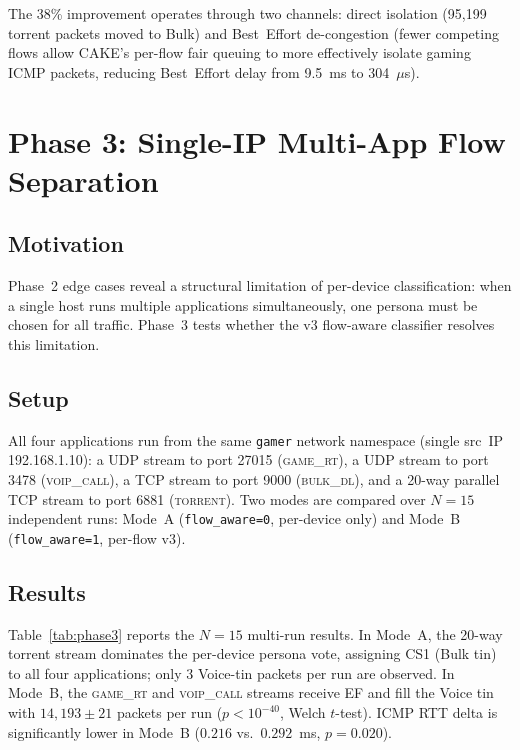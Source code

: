 The 38\% improvement operates through two channels: direct isolation (95,199 torrent packets moved to Bulk) and Best~Effort de-congestion (fewer competing flows allow CAKE's per-flow fair queuing to more effectively isolate gaming ICMP packets, reducing Best~Effort delay from 9.5~ms to 304~$\mu$s).

\section{Phase 3: Single-IP Multi-App Flow Separation}

\subsection{Motivation}

Phase~2 edge cases reveal a structural limitation of per-device classification: when a single host runs multiple applications simultaneously, one persona must be chosen for all traffic. Phase~3 tests whether the v3 flow-aware classifier resolves this limitation.

\subsection{Setup}

All four applications run from the same \texttt{gamer} network namespace (single src~IP 192.168.1.10): a UDP stream to port 27015 (\textsc{game\_rt}), a UDP stream to port 3478 (\textsc{voip\_call}), a TCP stream to port 9000 (\textsc{bulk\_dl}), and a 20-way parallel TCP stream to port 6881 (\textsc{torrent}). Two modes are compared over $N=15$ independent runs: Mode~A (\texttt{flow\_aware=0}, per-device only) and Mode~B (\texttt{flow\_aware=1}, per-flow v3).

\subsection{Results}

Table~\ref{tab:phase3} reports the $N{=}15$ multi-run results. In Mode~A, the 20-way torrent stream dominates the per-device persona vote, assigning CS1 (Bulk tin) to all four applications; only 3 Voice-tin packets per run are observed. In Mode~B, the \textsc{game\_rt} and \textsc{voip\_call} streams receive EF and fill the Voice tin with $14{,}193 \pm 21$ packets per run ($p < 10^{-40}$, Welch $t$-test). ICMP RTT delta is significantly lower in Mode~B ($0.216$ vs.\ $0.292$~ms, $p = 0.020$).

